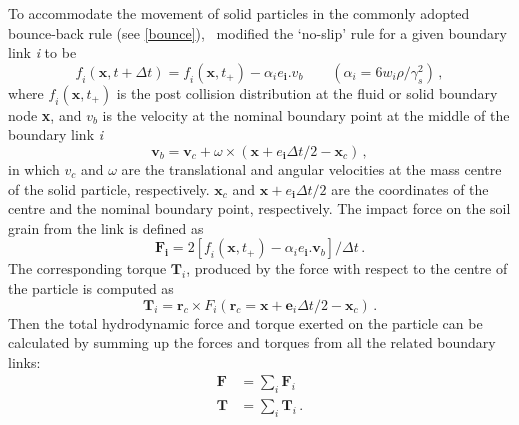 To accommodate the movement of solid particles in the commonly adopted 
bounce-back rule (see \cref{bounce}),~\citet{Ladd1994} modified the `no-slip' 
rule for a given boundary link \textit{i} to be
%
\begin{equation}
\mathit{f_i}(\mathbf{x}, t + \Delta t)=\mathit{f_i}(\mathbf{x}, t_{+}) - 
\alpha_{\mathit{i}}\mathbf{\mathit{e}_i}.\mathbf{\mathit{v}}_{b} \qquad 
(\alpha_{i}=6\mathit{w_i}\rho/\gamma_{\mathit{s}}^{2})\,,
\end{equation}
%
\noindent where $\mathit{f_i}(\mathbf{x}, t_{+})$ is the post collision 
distribution at the fluid or solid boundary node \textbf{x}, and 
$\mathit{v}_{b}$ is the velocity at the nominal boundary point at the middle of 
the boundary link \textit{i}
%
\begin{equation}
\mathbf{v}_{b}=\mathbf{v}_{c}+\omega \times 
(\mathbf{x}+\mathbf{\mathit{e}_i}\Delta t /2 - \mathbf{x}_{c})\,,
\end{equation}
%
\noindent in which $\mathbf{\mathit{v}}_{c}$ and $\omega$ are the translational 
and angular velocities at the mass centre of the solid particle, respectively. 
$\mathbf{x}_{c}$ and $\mathbf{x}+\mathbf{\mathit{e}_i}\Delta t /2$ are the 
coordinates of the centre and the nominal boundary point,  respectively. The 
impact force on the soil grain from the link is defined as
%
\begin{equation}
\mathbf{F_i}=2[\mathit{f_i} (\mathbf{x}, t_{+}) 
-\alpha_{\mathit{i}}\mathbf{\mathit{e}_i}.\mathbf{v}_{b}]/ \Delta t \,.
\end{equation} 
%
The corresponding torque $\mathbf{T}_{\mathit{i}}$, produced by the force with 
respect to the centre of the particle is computed as
%
\begin{equation}
\mathbf{T}_{\mathit{i}}=\mathbf{r}_{c} \times \mathit{F_i} 
(\mathbf{r}_{c}=\mathbf{x}+\mathbf{e}_{\mathit{i}} \Delta t /2 - \mathbf{x}_{c})
\,.
\end{equation}
%
Then the total hydrodynamic force and torque exerted on the particle can be 
calculated by summing up the forces and torques from all the related boundary 
links:
%
\begin{equation}
\begin{aligned}
\mathbf{F} &= \sum\limits_{\mathit{i}}{\mathbf{F}_{\mathit{i}}} \\
\mathbf{T} &= \sum\limits_{\mathit{i}}{\mathbf{T}_{\mathit{i}}} \,.
\end{aligned}
\end{equation}

